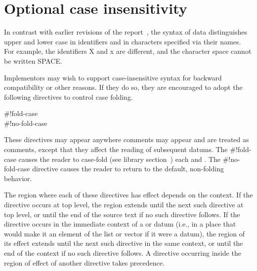 \chapter{Optional case insensitivity}
\label{caseinsensitivityappendix}

In contrast with earlier revisions of the report~\cite{R5RS}, the
syntax of data distinguishes upper and lower case in identifiers and in
characters specified via their names.  For example, the identifiers
{\cf X} and {\cf x} are different, and the character
{\cf\sharpsign\backwhack{}space} cannot be written
{\cf\sharpsign\backwhack{}SPACE}.

Implementors may wish to support case-insensitive syntax for backward
compatibility or other reasons.
If they do so, they are encouraged to adopt the following directives
to control case folding.

\begin{entry}{%
{\cf{}\#!fold-case}\\
{\cf{}\#!no-fold-case}}

These directives may appear anywhere comments may appear and are
treated as comments, except that they affect the reading of subsequent
datums.
The {\cf{}\#!fold-case} causes the reader to case-fold
(see library section~)
each  and .
The {\cf{}\#!no-fold-case} directive causes the reader to return
to the default, non-folding behavior.

The region where each of these directives has effect depends on the
context. If the directive occurs at top level, the region extends
until the next such directive at top level, or until the end of the
source text if no such directive follows.  If the directive occurs in
the immediate context of a  or  datum (i.e.,
in a place that would make it an element of the list or vector if it
were a datum), the region of its effect extends until the next such
directive in the same context, or until the end of the context if no
such directive follows. A directive occurring inside the region of
effect of another directive takes precedence.
\end{entry}

